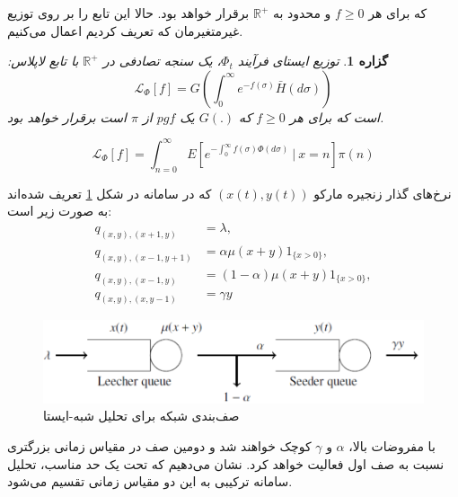 \documentclass[11pt, oneside]{article}
\newtheorem{proposition}{گزاره}
\begin{document}
که برای هر $f\geq0$ و محدود به $\mathbb{R}^+$ برقرار خواهد بود. حالا این تابع را بر روی توزیع غیرمتغیرمان که تعریف کردیم اعمال می‌کنیم.
\begin{proposition}
توزیع ایستای فرآیند $\Phi_t$، یک سنجه تصادفی در $\mathbb{R}^+$ با تابع لاپلاس:
\begin{equation}
\mathcal{L}_\Phi\left[f\right]=G\left(\int_{0}^{\infty}e^{-f(\sigma)}\bar{H}(d\sigma)\right)
\end{equation}
است که برای هر $f\geq0$ که $G(.)$ یک $pgf$ از $\pi$ است برقرار خواهد بود.
\end{proposition}

\begin{equation}
\mathcal{L}_\Phi\left[f\right]=\int_{n=0}^{\infty}E\left[e^{-\int_{0}^{\infty}f(\sigma)\Phi(d\sigma)}\ |\ x=n\right]\pi(n)
\end{equation}

نرخ‌های گذار زنجیره مارکو
 $(x(t),y(t))$ که در سامانه در شکل \ref{fig:1} تعریف شده‌اند به صورت زیر است:
\begin{subequations}
\begin{align}
q_{(x,y),(x+1,y)}&=\lambda,\\
q_{(x,y),(x-1,y+1)}&=\alpha\mu(x+y)1_{\{x>0\}},\\
q_{(x,y),(x-1,y)}&=(1-\alpha)\mu(x+y)1_{\{x>0\}},\\
q_{(x,y),(x,y-1)}&=\gamma y
\end{align}
\end{subequations}
\begin{figure}[!ht]
	\centering
	\includegraphics[width=0.8\columnwidth]{resources/fig1.png}
	\caption{صف‌بندی شبکه برای تحلیل شبه-ایستا}
	\label{fig:1}
\end{figure}
با مفروضات بالا، $\alpha$ و $\gamma$ کوچک خواهند شد و دومین صف در مقیاس زمانی بزرگتری نسبت به صف اول فعالیت خواهد کرد. نشان می‌دهیم که تحت یک حد مناسب، تحلیل سامانه ترکیبی به این دو مقیاس زمانی تقسیم می‌شود.
\end{document}

